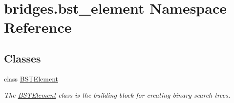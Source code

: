 \hypertarget{namespacebridges_1_1bst__element}{}\section{bridges.\+bst\+\_\+element Namespace Reference}
\label{namespacebridges_1_1bst__element}
\subsection*{Classes}
\begin{DoxyCompactItemize}
\item 
class \mbox{\hyperlink{classbridges_1_1bst__element_1_1_b_s_t_element}{B\+S\+T\+Element}}
\begin{DoxyCompactList}\small\item\em The \mbox{\hyperlink{classbridges_1_1bst__element_1_1_b_s_t_element}{B\+S\+T\+Element}} class is the building block for creating binary search trees. \end{DoxyCompactList}\end{DoxyCompactItemize}
